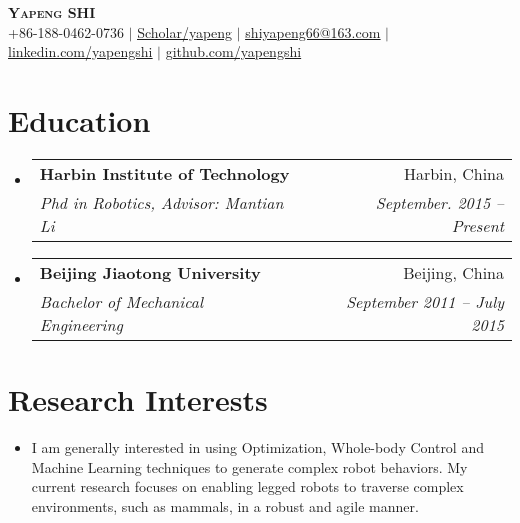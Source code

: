 \documentclass[letterpaper,11pt]{article}
\makeatletter
\newcommand{\resumeSubheading}[4]{
  \vspace{-2pt}\item
    \begin{tabular*}{0.97\textwidth}[t]{l@{\extracolsep{\fill}}r}
      \textbf{#1} & #2 \\
      \textit{#3} & \textit{\small #4} \\
    \end{tabular*}\vspace{-7pt}
}
\newcommand{\resumeSubHeadingListStart}{\begin{itemize}[leftmargin=0.15in, label={}]}
\newcommand{\resumeSubHeadingListEnd}{\end{itemize}}
\makeatother
\begin{document}

\begin{center}
    \textbf{\Huge \scshape Yapeng SHI} \\ \vspace{1pt}
    \small +86-188-0462-0736 $|$
    \href{https://scholar.google.com/citations?user=00aEs2gAAAAJ&hl=en}{\underline{Scholar/yapeng}} $|$ \href{mailto:shiyapeng66@163.com}{\underline{shiyapeng66@163.com}} $|$ 
    \href{https://www.linkedin.com/in/YapengShi}{\underline{linkedin.com/yapengshi}} $|$
    \href{https://github.com/yapengshi}{\underline{github.com/yapengshi}}
\end{center}


\section{Education}
  \resumeSubHeadingListStart
    \resumeSubheading
      {Harbin Institute of Technology}{Harbin, China}
      {Phd in Robotics, Advisor: Mantian Li}{September. 2015 -- Present}
    \resumeSubheading
      {Beijing Jiaotong University}{Beijing, China}
      {Bachelor of Mechanical Engineering}{September 2011 -- July 2015}
  \resumeSubHeadingListEnd
  
\vspace{-5mm}
\section{Research Interests}
 \begin{itemize}[leftmargin=0.2in, label={}]
\justifying \item I am generally interested in using Optimization, Whole-body Control and Machine Learning techniques to generate complex robot behaviors. My current research focuses on enabling legged robots to traverse complex environments, such as mammals, in a robust and agile manner.
\end{itemize}

\vspace{-7mm}
\end{document}
